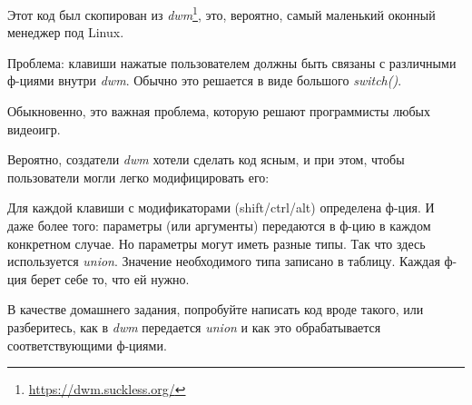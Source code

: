 
Этот код был скопирован из \emph{dwm}\footnote{\url{https://dwm.suckless.org/}}, это, вероятно, самый маленький оконный менеджер
под Linux.

Проблема: клавиши нажатые пользователем должны быть связаны с различными ф-циями внутри \emph{dwm}.
Обычно это решается в виде большого \emph{switch()}.

Обыкновенно, это важная проблема, которую решают программисты любых видеоигр.

Вероятно, создатели \emph{dwm} хотели сделать код ясным, и при этом, чтобы пользователи могли легко модифицировать его:



Для каждой клавиши с модификаторами (shift/ctrl/alt) определена ф-ция.
И даже более того: параметры (или аргументы) передаются в ф-цию в каждом конкретном случае.
Но параметры могут иметь разные типы.
Так что здесь используется \emph{union}.
Значение необходимого типа записано в таблицу.
Каждая ф-ция берет себе то, что ей нужно.

В качестве домашнего задания, попробуйте написать код вроде такого, или разберитесь, как в 
\emph{dwm} передается \emph{union} и как это обрабатывается соответствующими ф-циями.

